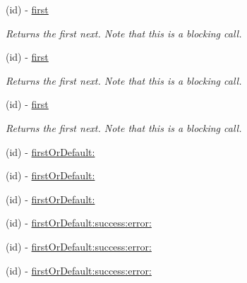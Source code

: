 \begin{DoxyCompactItemize}
\item 
\mbox{\label{interface_r_a_c_signal_a06f71dd31099b1ed555f0b9fcbbdf6f1}} 
(id) -\/ \mbox{\hyperlink{interface_r_a_c_signal_a06f71dd31099b1ed555f0b9fcbbdf6f1}{first}}
\begin{DoxyCompactList}\small\item\em Returns the first {\ttfamily next}. Note that this is a blocking call. \end{DoxyCompactList}\item 
\mbox{\label{interface_r_a_c_signal_a06f71dd31099b1ed555f0b9fcbbdf6f1}} 
(id) -\/ \mbox{\hyperlink{interface_r_a_c_signal_a06f71dd31099b1ed555f0b9fcbbdf6f1}{first}}
\begin{DoxyCompactList}\small\item\em Returns the first {\ttfamily next}. Note that this is a blocking call. \end{DoxyCompactList}\item 
\mbox{\label{interface_r_a_c_signal_a06f71dd31099b1ed555f0b9fcbbdf6f1}} 
(id) -\/ \mbox{\hyperlink{interface_r_a_c_signal_a06f71dd31099b1ed555f0b9fcbbdf6f1}{first}}
\begin{DoxyCompactList}\small\item\em Returns the first {\ttfamily next}. Note that this is a blocking call. \end{DoxyCompactList}\item 
(id) -\/ \mbox{\hyperlink{interface_r_a_c_signal_a51f980781f2dc9e662278d7db7b0cd38}{first\+Or\+Default\+:}}
\item 
(id) -\/ \mbox{\hyperlink{interface_r_a_c_signal_a51f980781f2dc9e662278d7db7b0cd38}{first\+Or\+Default\+:}}
\item 
(id) -\/ \mbox{\hyperlink{interface_r_a_c_signal_a51f980781f2dc9e662278d7db7b0cd38}{first\+Or\+Default\+:}}
\item 
(id) -\/ \mbox{\hyperlink{interface_r_a_c_signal_a12b765a16842e9c7aa1d13b00d8df09b}{first\+Or\+Default\+:success\+:error\+:}}
\item 
(id) -\/ \mbox{\hyperlink{interface_r_a_c_signal_a12b765a16842e9c7aa1d13b00d8df09b}{first\+Or\+Default\+:success\+:error\+:}}
\item 
(id) -\/ \mbox{\hyperlink{interface_r_a_c_signal_a12b765a16842e9c7aa1d13b00d8df09b}{first\+Or\+Default\+:success\+:error\+:}}
\item 

\end{DoxyCompactItemize}
